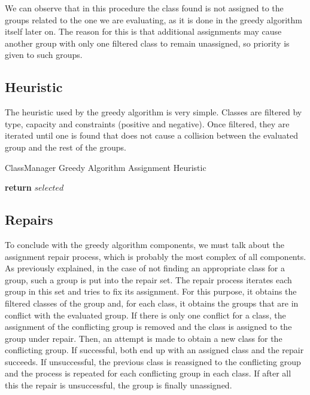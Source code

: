 We can observe that in this procedure the class found is not assigned to the groups related to the one we are evaluating, as it is done in the greedy algorithm itself later on. The reason for this is that additional assignments may cause another group with only one filtered class to remain unassigned, so priority is given to such groups.


\subsection{Heuristic}

The heuristic used by the greedy algorithm is very simple. Classes are filtered by type, capacity and constraints (positive and negative). Once filtered, they are iterated until one is found that does not cause a collision between the evaluated group and the rest of the groups.

\begin{algorithm}[H]
    \caption{ClassManager Greedy Algorithm Assignment Heuristic}
    \begin{algorithmic}[1]
                 
                \EndIf
            \EndFor
            \State \textbf{return} $selected$
        \EndProcedure
    \end{algorithmic}
\end{algorithm}


\subsection{Repairs}

To conclude with the greedy algorithm components, we must talk about the assignment repair process, which is probably the most complex of all components. As previously explained, in the case of not finding an appropriate class for a group, such a group is put into the repair set. The repair process iterates each group in this set and tries to fix its assignment. For this purpose, it obtains the filtered classes of the group and, for each class, it obtains the groups that are in conflict with the evaluated group. If there is only one conflict for a class, the assignment of the conflicting group is removed and the class is assigned to the group under repair. Then, an attempt is made to obtain a new class for the conflicting group. If successful, both end up with an assigned class and the repair succeeds. If unsuccessful, the previous class is reassigned to the conflicting group and the process is repeated for each conflicting group in each class. If after all this the repair is unsuccessful, the group is finally unassigned.

